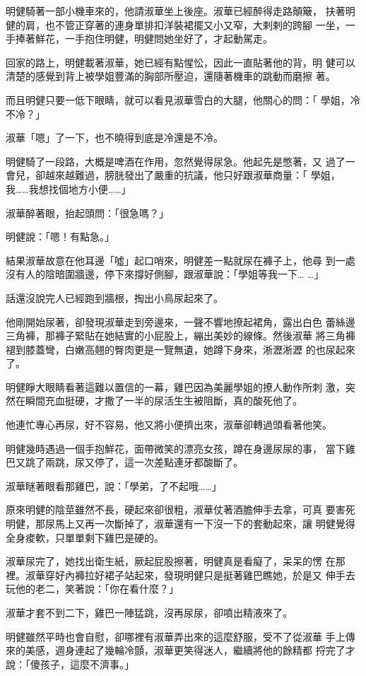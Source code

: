 明健騎著一部小機車來的，他請淑華坐上後座。淑華已經醉得走路顛簸，
扶著明健的肩，也不管正穿著的連身單排扣洋裝裙擺又小又窄，大剌剌的跨腳
一坐，一手捧著鮮花，一手抱住明健，明健問她坐好了，才起動駕走。

回家的路上，明健載著淑華，她已經有點惺忪，因此一直貼著他的背，明
健可以清楚的感覺到背上被學姐豐滿的胸部所壓迫，還隨著機車的跳動而磨擦
著。

而且明健只要一低下眼睛，就可以看見淑華雪白的大腿，他關心的問：「
學姐，冷不冷？」

淑華「嗯」了一下，也不曉得到底是冷還是不冷。

明健騎了一段路，大概是啤酒在作用，忽然覺得尿急。他起先是憋著，又
過了一會兒，卻越來越難過，膀胱發出了嚴重的抗議，他只好跟淑華商量：「
學姐，我……我想找個地方小便……」

淑華醉著眼，抬起頭問：「很急嗎？」

明健說：「嗯！有點急。」

結果淑華故意在他耳邊「噓」起口哨來，明健差一點就尿在褲子上，他尋
到一處沒有人的陰暗圍牆邊，停下來撐好側腳，跟淑華說：「學姐等我一下…
…」

話還沒說完人已經跑到牆根，掏出小鳥尿起來了。

他剛開始尿著，卻發現淑華走到旁邊來，一聲不響地撩起裙角，露出白色
蕾絲邊三角褲，那褲子緊貼在她結實的小屁股上，繃出美妙的線條。然後淑華
將三角褲褪到膝蓋彎，白嫩高翹的臀肉更是一覽無遺，她蹲下身來，淅瀝淅瀝
的也尿起來了。

明健睜大眼睛看著這難以置信的一幕，雞巴因為美麗學姐的撩人動作所刺
激，突然在瞬間充血挺硬，才撒了一半的尿活生生被阻斷，真的酸死他了。

他連忙專心再尿，好不容易，他又將小便擠出來，淑華卻轉過頭看著他笑。

明健幾時遇過一個手抱鮮花，面帶微笑的漂亮女孩，蹲在身邊尿尿的事，
當下雞巴又跳了兩跳，尿又停了，這一次差點連牙都酸斷了。

淑華瞇著眼看那雞巴，說：「學弟，了不起哦……」

原來明健的陰莖雖然不長，硬起來卻很粗，淑華仗著酒膽伸手去拿，可真
要害死明健，那尿馬上又再一次斷掉了，淑華還有一下沒一下的套動起來，讓
明健覺得全身痠軟，只單單剩下雞巴是硬的。

淑華尿完了，她找出衛生紙，厥起屁股擦著，明健真是看癡了，呆呆的愣
在那裡。淑華穿好內褲拉好裙子站起來，發現明健只是挺著雞巴瞧她，於是又
伸手去玩他的老二，笑著說：「你在看什麼？」

淑華才套不到二下，雞巴一陣猛跳，沒再尿尿，卻噴出精液來了。

明健雖然平時也會自慰，卻哪裡有淑華弄出來的這麼舒服，受不了從淑華
手上傳來的美感，週身連起了幾輪冷顫，淑華更笑得迷人，繼續將他的餘精都
捋完了才說：「傻孩子，這麼不濟事。」

